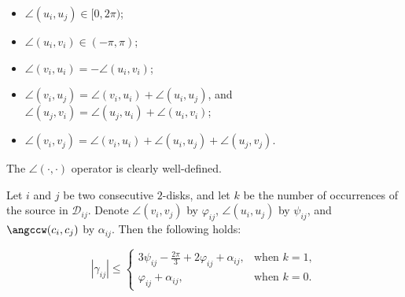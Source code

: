 \begin{itemize}
\item $\angle(u_i, u_j)\in[0, 2\pi)$;
\item $\angle(u_i, v_i)\in(-\pi, \pi)$; %
\item $\angle(v_i, u_i) = -\angle(u_i, v_i)$;
\item $\angle(v_i, u_j) = \angle(v_i, u_i) + \angle(u_i, u_j)$, and $\angle(u_j, v_i) = \angle(u_j, u_i) + \angle(u_i, v_i)$;
\item $\angle(v_i, v_j) = \angle(v_i, u_i) + \angle(u_i, u_j) + \angle(u_j, v_j)$.
\end{itemize}

The $\angle(\cdot, \cdot)$ operator is clearly well-defined.



\begin{claim}
\label{lemma:can-construct}

Let $i$ and $j$ be two consecutive $2$-disks, and let $k$ be the number of occurrences of the source in $\mathcal{D}_{ij}$. Denote $\angle(v_i, v_j)$ by $\varphi_{ij}$, $\angle(u_i, u_j)$ by $\psi_{ij}$, and $\angccw(c_i, c_j)$ by $\alpha_{ij}$. Then the following holds:

\begin{equation}
\label{eq:curve_bound}
|\gamma_{ij}|\leq\begin{cases}
\displaystyle
3\psi_{ij} - \frac{2\pi}{3} + 2\varphi_{ij} + \alpha_{ij}, & \text{when }k = 1, \\
\varphi_{ij} + \alpha_{ij}, & \text{when }k = 0.
\end{cases}%
\end{equation}
\end{claim}

